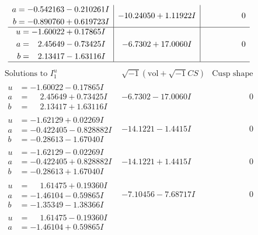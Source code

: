 \documentclass[1p]{elsarticle_modified}
\theoremstyle{definition}
\newcommand{\I}{\sqrt{-1}}
\begin{document}
$$\begin{array}{c|c|c}
\begin{aligned}
a &= -0.542163 - 0.210261 I \\
b &= -0.890760 + 0.619723 I\end{aligned}
 & -10.24050 + 1.11922 I & \phantom{-0.000000 } 0 \\ \hline\begin{aligned}
u &= -1.60022 + 0.17865 I \\
a &= \phantom{-}2.45649 - 0.73425 I \\
b &= \phantom{-}2.13417 - 1.63116 I\end{aligned}
 & -6.7302 + 17.0060 I & \phantom{-0.000000 } 0\\
 \hline 
 \end{array}$$\newpage$$\begin{array}{c|c|c}  
\text{Solutions to }I^u_{1}& \I (\text{vol} + \sqrt{-1}CS) & \text{Cusp shape}\\
 \hline 
\begin{aligned}
u &= -1.60022 - 0.17865 I \\
a &= \phantom{-}2.45649 + 0.73425 I \\
b &= \phantom{-}2.13417 + 1.63116 I\end{aligned}
 & -6.7302 - 17.0060 I & \phantom{-0.000000 } 0 \\ \hline\begin{aligned}
u &= -1.62129 + 0.02269 I \\
a &= -0.422405 - 0.828882 I \\
b &= -0.28613 - 1.67040 I\end{aligned}
 & -14.1221 - 1.4415 I & \phantom{-0.000000 } 0 \\ \hline\begin{aligned}
u &= -1.62129 - 0.02269 I \\
a &= -0.422405 + 0.828882 I \\
b &= -0.28613 + 1.67040 I\end{aligned}
 & -14.1221 + 1.4415 I & \phantom{-0.000000 } 0 \\ \hline\begin{aligned}
u &= \phantom{-}1.61475 + 0.19360 I \\
a &= -1.46104 - 0.59865 I \\
b &= -1.35349 - 1.38366 I\end{aligned}
 & -7.10456 - 7.68717 I & \phantom{-0.000000 } 0 \\ \hline\begin{aligned}
u &= \phantom{-}1.61475 - 0.19360 I \\
a &= -1.46104 + 0.59865 I \\

\end{aligned}
\end{array}$$
\end{document}
